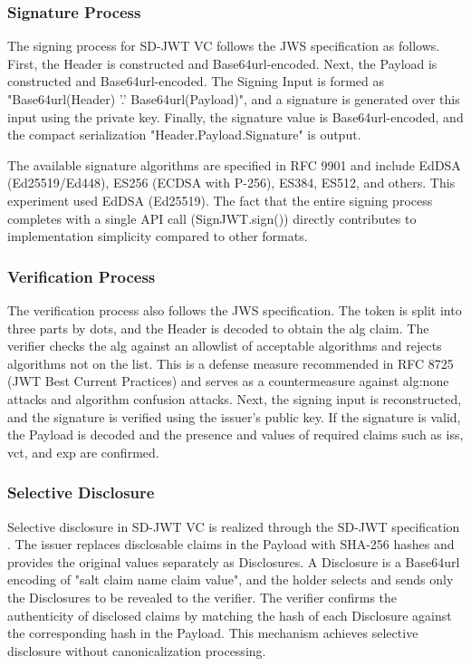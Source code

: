 \documentclass[conference]{IEEEtran}
\begin{document}
\subsubsection{Signature Process}

The signing process for SD-JWT VC follows the JWS specification as follows. First, the Header is constructed and Base64url-encoded. Next, the Payload is constructed and Base64url-encoded. The Signing Input is formed as "Base64url(Header) \textbar\textbar{} '.' \textbar\textbar{} Base64url(Payload)", and a signature is generated over this input using the private key. Finally, the signature value is Base64url-encoded, and the compact serialization "Header.Payload.Signature" is output.

The available signature algorithms are specified in RFC 9901 and include EdDSA (Ed25519/Ed448), ES256 (ECDSA with P-256), ES384, ES512, and others. This experiment used EdDSA (Ed25519). The fact that the entire signing process completes with a single API call (SignJWT.sign()) directly contributes to implementation simplicity compared to other formats.

\subsubsection{Verification Process}

The verification process also follows the JWS specification. The token is split into three parts by dots, and the Header is decoded to obtain the alg claim. The verifier checks the alg against an allowlist of acceptable algorithms and rejects algorithms not on the list. This is a defense measure recommended in RFC 8725 \cite{ref5} (JWT Best Current Practices) and serves as a countermeasure against alg:none attacks and algorithm confusion attacks. Next, the signing input is reconstructed, and the signature is verified using the issuer's public key. If the signature is valid, the Payload is decoded and the presence and values of required claims such as iss, vct, and exp are confirmed.

\subsubsection{Selective Disclosure}

Selective disclosure in SD-JWT VC is realized through the SD-JWT specification \cite{ref7}. The issuer replaces disclosable claims in the Payload with SHA-256 hashes and provides the original values separately as Disclosures. A Disclosure is a Base64url encoding of "salt \textbar\textbar{} claim name \textbar\textbar{} claim value", and the holder selects and sends only the Disclosures to be revealed to the verifier. The verifier confirms the authenticity of disclosed claims by matching the hash of each Disclosure against the corresponding hash in the Payload. This mechanism achieves selective disclosure without canonicalization processing.
\end{document}
